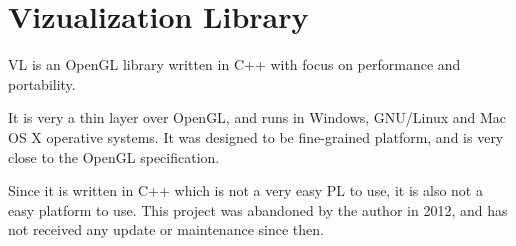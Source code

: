 

\section{Vizualization Library} %
\label{sec:vizualization_library}

\gls{VL}\cite{visualizationLibrary} is an OpenGL library written in C++ with focus on performance and portability. 

It is very a thin layer over OpenGL, and runs in Windows, GNU/Linux and Mac OS X operative systems. It was designed to be fine-grained platform, and is very close to the OpenGL specification. 

Since it is written in C++ which is not a very easy \gls{PL} to use, it is also not a easy platform to use.
This project was abandoned by the author in 2012, and has not received any update or maintenance since then.



		